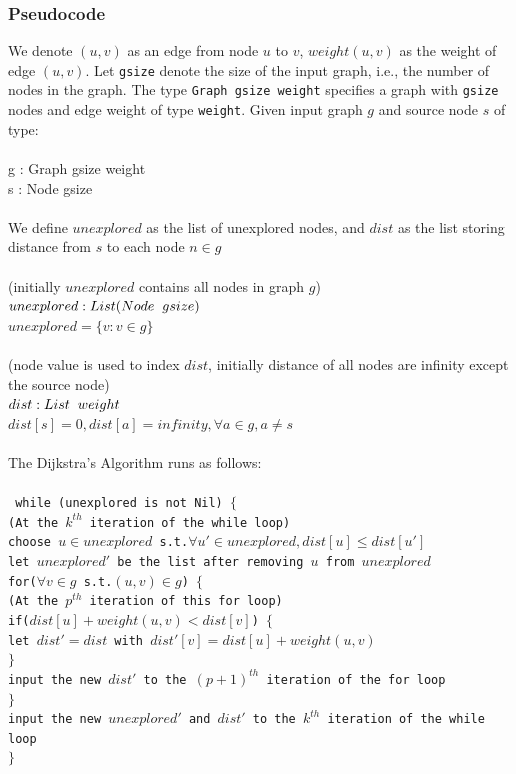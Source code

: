 \documentclass[11pt, a4paper]{article} %
\theoremstyle{definition}
\newcommand\tab[1][1cm]{\hspace*{#1}}
\newcommand\tsp[1][0.2cm]{\hspace*{#1}}
\begin{document}
\subsubsection{Pseudocode}
We denote $(u, v)$ as an edge from node $u$ to $v$, $weight(u, v)$ as the weight of edge $(u, v)$. Let \texttt{gsize} denote the size of the input graph, i.e., the number of nodes in the graph. The type \texttt{Graph gsize weight} specifies a graph with \texttt{gsize} nodes and edge weight of type \texttt{weight}. Given input graph $g$ and source node $s$ of type:
\\\\
  \tab g : Graph gsize weight\\
  \tab s : Node gsize
\\\\
We define $unexplored$ as the list of unexplored nodes, and $dist$ as the list storing distance from $s$ to each node $n \in g$
\\\\
\tab (initially $unexplored$ contains all nodes in graph $g$)\\
\tab $unexplored : List (Node \tsp gsize)$\\
\tab $unexplored = \{v : v \in g\}$
\\\\
\tab (node value is used to index $dist$, initially distance of all nodes are infinity except 
\\ \tab the source node)\\
\tab $dist : List \tsp weight$ \\
\tab $dist[s] = 0, dist[a] = infinity, \forall a \in g, a \neq s$
\\\\
The Dijkstra's Algorithm runs as follows: 
\\\\
\texttt{
  \tab while (unexplored is not Nil) 
  \tab$\{$ \\
  \tab\tab (At the $k^{th}$ iteration of the while loop)                                          \\
  \tab\tab choose $u \in unexplored$ s.t.$\forall u' \in unexplored, dist[u] \leq dist[u']$     \\
  \tab\tab let $unexplored'$ be the list after removing $u$ from $unexplored$                    \\
  \tab\tab for($\forall v \in g$ s.t.$(u, v) \in g$) $\{$                                 \\  
  \tab\tab\tab (At the $p^{th}$ iteration of this for loop)                                \\
  \tab\tab\tab  if($dist[u] + weight(u, v) < dist[v]$) $\{$                              \\
  \tab\tab\tab\tab  let $dist' = dist$ with $dist'[v] = dist[u] + weight(u, v)$          \\
  \tab\tab\tab $\}$ \\ 
  \tab\tab\tab input the new $dist'$ to the $(p+1)^{th}$ iteration of the for loop \\
  \tab\tab $\}$ \\
  \tab\tab input the new $unexplored'$ and $dist'$ to the $k^{th}$ iteration of the while loop \\
  \tab $\}$
}
\end{document}
